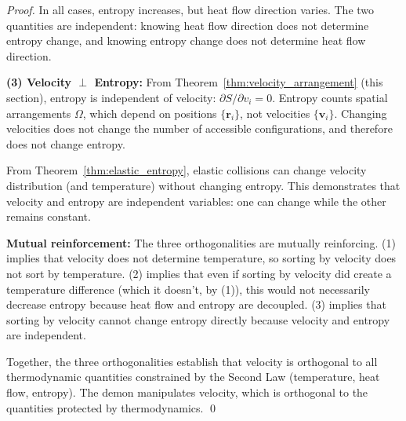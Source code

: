 \documentclass[12pt,a4paper]{article}
\theoremstyle{definition}
\theoremstyle{remark}
\begin{document}
\begin{proof}
In all cases, entropy increases, but heat flow direction varies. The two quantities are independent: knowing heat flow direction does not determine entropy change, and knowing entropy change does not determine heat flow direction.

\textbf{(3) Velocity $\perp$ Entropy:}
From Theorem~\ref{thm:velocity_arrangement} (this section), entropy is independent of velocity: $\partial S / \partial v_i = 0$. Entropy counts spatial arrangements $\Omega$, which depend on positions $\{\mathbf{r}_i\}$, not velocities $\{\mathbf{v}_i\}$. Changing velocities does not change the number of accessible configurations, and therefore does not change entropy.

From Theorem~\ref{thm:elastic_entropy}, elastic collisions can change velocity distribution (and temperature) without changing entropy. This demonstrates that velocity and entropy are independent variables: one can change while the other remains constant.

\textbf{Mutual reinforcement:}
The three orthogonalities are mutually reinforcing. (1) implies that velocity does not determine temperature, so sorting by velocity does not sort by temperature. (2) implies that even if sorting by velocity did create a temperature difference (which it doesn't, by (1)), this would not necessarily decrease entropy because heat flow and entropy are decoupled. (3) implies that sorting by velocity cannot change entropy directly because velocity and entropy are independent.

Together, the three orthogonalities establish that velocity is orthogonal to all thermodynamic quantities constrained by the Second Law (temperature, heat flow, entropy). The demon manipulates velocity, which is orthogonal to the quantities protected by thermodynamics. \qed
\end{proof}
\end{document}
